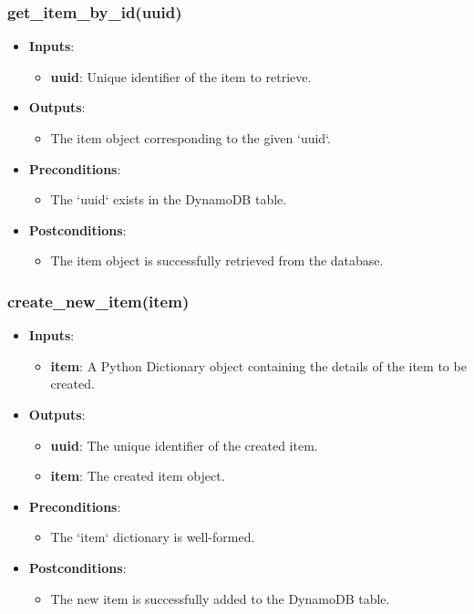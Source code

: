 \documentclass[12pt, titlepage]{article}
\begin{document}
\subsubsection{get\_item\_by\_id(uuid)}
\begin{itemize}
    \item \textbf{Inputs}:
        \begin{itemize}
            \item \textbf{uuid}: Unique identifier of the item to retrieve.
        \end{itemize}
    \item \textbf{Outputs}:
        \begin{itemize}
            \item The item object corresponding to the given `uuid`.
        \end{itemize}
    \item \textbf{Preconditions}:
        \begin{itemize}
            \item The `uuid` exists in the DynamoDB table.
        \end{itemize}
    \item \textbf{Postconditions}:
        \begin{itemize}
            \item The item object is successfully retrieved from the database.
        \end{itemize}
\end{itemize}

\subsubsection{create\_new\_item(item)}
\begin{itemize}
    \item \textbf{Inputs}:
        \begin{itemize}
            \item \textbf{item}: A Python Dictionary object containing the details of the item to be created.
        \end{itemize}
    \item \textbf{Outputs}:
        \begin{itemize}
            \item \textbf{uuid}: The unique identifier of the created item.
            \item \textbf{item}: The created item object.
        \end{itemize}
    \item \textbf{Preconditions}:
        \begin{itemize}
            \item The `item` dictionary is well-formed.
        \end{itemize}
    \item \textbf{Postconditions}:
        \begin{itemize}
            \item The new item is successfully added to the DynamoDB table.
        \end{itemize}
\end{itemize}
\end{document}
